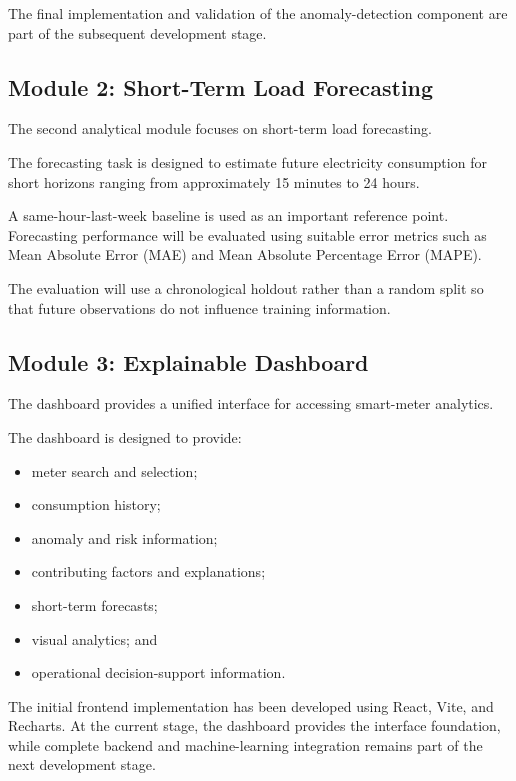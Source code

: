 \documentclass{tietreport}
\begin{document}
The final implementation and validation of the anomaly-detection component
are part of the subsequent development stage.

\subsection{Module 2: Short-Term Load Forecasting}

The second analytical module focuses on short-term load forecasting.

The forecasting task is designed to estimate future electricity consumption
for short horizons ranging from approximately 15 minutes to 24 hours.

A same-hour-last-week baseline is used as an important reference point.
Forecasting performance will be evaluated using suitable error metrics such
as Mean Absolute Error (MAE) and Mean Absolute Percentage Error (MAPE).

The evaluation will use a chronological holdout rather than a random split
so that future observations do not influence training information.

\subsection{Module 3: Explainable Dashboard}

The dashboard provides a unified interface for accessing smart-meter
analytics.

The dashboard is designed to provide:

\begin{itemize}
    \item meter search and selection;
    \item consumption history;
    \item anomaly and risk information;
    \item contributing factors and explanations;
    \item short-term forecasts;
    \item visual analytics; and
    \item operational decision-support information.
\end{itemize}

The initial frontend implementation has been developed using React, Vite,
and Recharts. At the current stage, the dashboard provides the interface
foundation, while complete backend and machine-learning integration remains
part of the next development stage.
\end{document}
